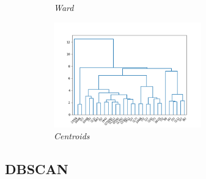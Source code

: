 \begin{figure}
\begin{subfigure}{0.49\textwidth}
        \caption{\emph{Ward}}
        \label{fig:ward_img}
    \end{subfigure}
    \begin{subfigure}{0.49\textwidth}
         \centering
         \includegraphics[width=0.7\textwidth]{img/clustering/centroid.png}
         \caption{\emph{Centroids}}
         \label{fig:centr_img}
     \end{subfigure}
     \caption{}
    \label{fig:dendograms}
\end{figure}

\subsection{DBSCAN}

